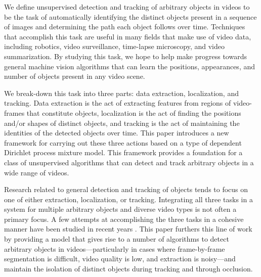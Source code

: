 \documentclass{article}
\newcommand{\willie}[1]{\textcolor{green}{\textsf{\emph{\textbf{\textcolor{green}{#1}}}}}}
\begin{document}
We define unsupervised detection and tracking of arbitrary objects in videos to be the task of automatically identifying the distinct objects present in a sequence of images and determining the path each object follows over time. Techniques that accomplish this task are useful in many fields that make use of video data, including robotics, video surveillance, time-lapse microscopy, and video summarization. By studying this task, we hope to help make progress towards general machine vision algorithms that can learn the positions, appearances, and number of objects present in any video scene.

We break-down this task into three parts: data extraction, localization, and tracking. Data extraction is the act of extracting features from regions of video-frames that constitute objects, localization is the act of finding the positions and/or shapes of distinct objects, and tracking is the act of maintaining the identities of the detected objects over time. This paper introduces a new framework for carrying out these three actions based on a type of dependent Dirichlet process mixture model. This framework provides a foundation for a class of unsupervised algorithms that can detect and track arbitrary objects in a wide range of videos.

Research related to general detection and tracking of objects tends to focus on one of either extraction, localization, or tracking. Integrating all three tasks in a system for multiple arbitrary objects and diverse video types is not often a primary focus. A few attempts at accomplishing the three tasks in a cohesive manner have been studied in recent years \cite{brostow2006unsupervised, brox2010object, fragkiadaki2011detection, pece_2002}.
This paper furthers this line of work by providing a model that gives rise to a number of algorithms to detect arbitrary objects in videos---particularly in cases where frame-by-frame segmentation is difficult, video quality is low, and extraction is noisy---and maintain the isolation of distinct objects during tracking and through occlusion.
\end{document}
